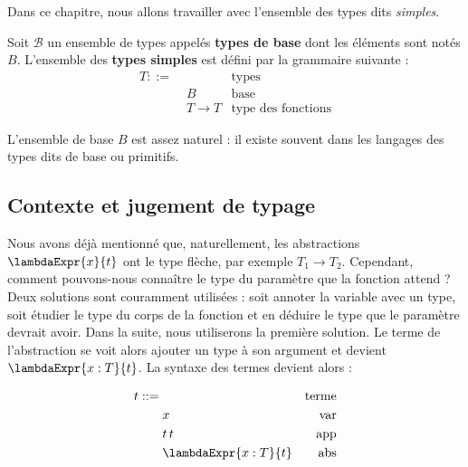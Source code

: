 Dans ce chapitre, nous allons travailler avec l'ensemble des types dits
\textit{simples}.

\begin{definition}
  \label{def:simply-typed-lambda-calculus-types}
  Soit $\mathcal{B}$ un ensemble de types appelés \textbf{types de base} dont
  les éléments sont notés $B$.
  L'ensemble des \textbf{types simples} est défini par la grammaire suivante :
  \begin{align*}
    T ::= & \, & \text{types} \\
          & \; B & \text{base} \\
          & \; T \rightarrow T & \text{type des fonctions}
  \end{align*}
\end{definition}

L'ensemble de base $B$ est assez naturel : il existe souvent dans les langages
des types dits de base ou primitifs.



\subsection*{Contexte et jugement de typage}

Nous avons déjà mentionné que, naturellement, les abstractions $\lambdaExpr{x}{t}$ ont le type
flèche, par exemple $T_{1} \rightarrow T_{2}$. Cependant, comment pouvons-nous
connaître le type du paramètre que la
fonction attend ? Deux solutions sont couramment utilisées : soit annoter la
variable avec un type, soit étudier le type du corps de la fonction et
en déduire le type que le paramètre devrait avoir.
Dans la suite, nous utiliserons la première solution. Le terme de l'abstraction
se voit alors ajouter un type à son argument et devient $\lambdaExpr{x : T}{t}$.
La syntaxe des termes devient alors :

\begin{align*}
  \label{def:simply-typed-lambda-calculus-terms}
  t ::= & \, & \text{terme} \\
        & \; x & \text{var} \\
        & \; t \, t & \text{app} \\
        & \; \lambdaExpr{x : T}{t} & \text{abs}
\end{align*}

